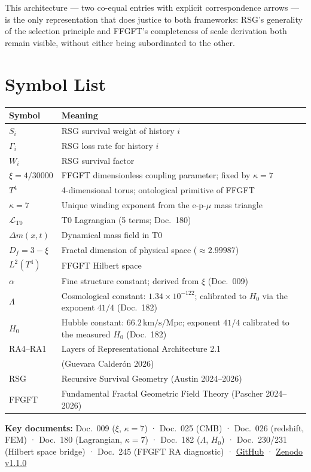 This architecture — two co-equal entries with explicit correspondence
arrows — is the only representation that does justice to both frameworks:
RSG's generality of the selection principle and FFGFT's completeness of
scale derivation both remain visible, without either being subordinated
to the other.

\section{Symbol List}

{\small
\begin{tabular}{p{3cm}p{10.5cm}}
\toprule
\textbf{Symbol} & \textbf{Meaning} \\
\midrule
$S_i$ & RSG survival weight of history $i$ \\
$\Gamma_i$ & RSG loss rate for history $i$ \\
$W_i$ & RSG survival factor \\
$\xi = 4/30000$ & FFGFT dimensionless coupling parameter; fixed by $\kappa=7$ \\
$T^4$ & 4-dimensional torus; ontological primitive of FFGFT \\
$\kappa = 7$ & Unique winding exponent from the e-p-$\mu$ mass triangle \\
$\mathcal{L}_{\text{T0}}$ & T0 Lagrangian (5 terms; Doc.~180) \\
$\Delta m(x,t)$ & Dynamical mass field in T0 \\
$D_f = 3-\xi$ & Fractal dimension of physical space ($\approx 2.99987$) \\
$L^2(T^4)$ & FFGFT Hilbert space \\
$\alpha$ & Fine structure constant; derived from $\xi$ (Doc.~009) \\
$\Lambda$ & Cosmological constant: $1.34\times10^{-122}$; calibrated to $H_0$ via the exponent $41/4$ (Doc.~182) \\
$H_0$ & Hubble constant: $66.2\,\text{km/s/Mpc}$; exponent $41/4$ calibrated to the measured $H_0$ (Doc.~182) \\
RA4--RA1 & Layers of Representational Architecture 2.1\\
          & \quad (Guevara Calderón 2026) \\
RSG & Recursive Survival Geometry (Austin 2024--2026) \\
FFGFT & Fundamental Fractal Geometric Field Theory (Pascher 2024--2026) \\
\bottomrule
\end{tabular}
}

\vspace{1em}
\noindent\textbf{Key documents:}
Doc.~009 ($\xi$, $\kappa=7$) ·
Doc.~025 (CMB) ·
Doc.~026 (redshift, FEM) ·
Doc.~180 (Lagrangian, $\kappa=7$) ·
Doc.~182 ($\Lambda$, $H_0$) ·
Doc.~230/231 (Hilbert space bridge) ·
Doc.~245 (FFGFT RA diagnostic) ·
\href{https://github.com/jpascher/T0-Time-Mass-Duality}{GitHub} ·
\href{https://doi.org/10.5281/zenodo.20117635}{Zenodo v1.1.0}
